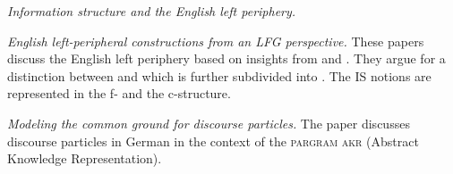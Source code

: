 \documentclass[output=paper,hidelinks]{langscibook}
\begin{document}

\vspace{+6pt}
\citet{Szucs2014} \textit{Information structure and the English left periphery.}

\citet{Szucs2017} \textit{English left-peripheral constructions from an LFG perspective.} These papers discuss the English left periphery based on insights from \citet{Prince} and \citet{WardBirner}. They argue for a distinction between \textsc{} and \textsc{} which is further subdivided into \textsc{}. The IS notions are represented in the f- and the c-structure. 

\vspace{+6pt} 
\citet{Zymlaetal15} \textit{Modeling the common ground for discourse particles.} The paper discusses discourse particles in German in the context of the \textsc{pargram} \textsc{akr} (Abstract Knowledge Representation).

\end{document}
